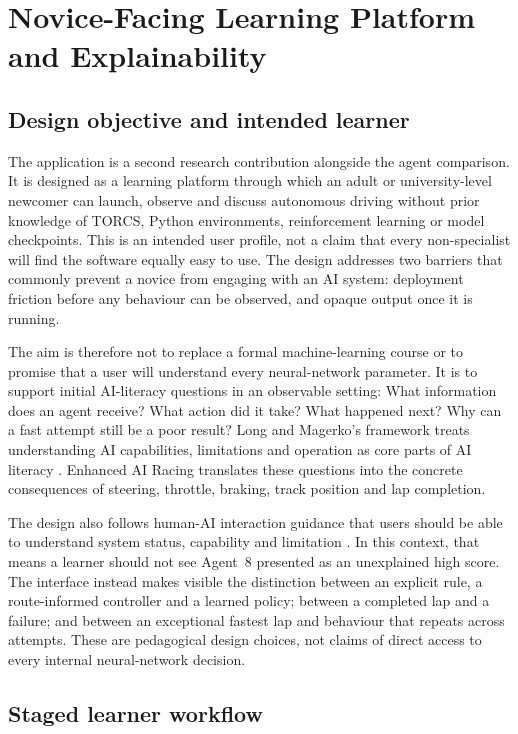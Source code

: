 \section{Novice-Facing Learning Platform and Explainability}
\label{ch:telemetry-gui}

\subsection{Design objective and intended learner}

The application is a second research contribution alongside the agent comparison. It is designed as a learning platform through which an adult or university-level newcomer can launch, observe and discuss autonomous driving without prior knowledge of TORCS, Python environments, reinforcement learning or model checkpoints. This is an intended user profile, not a claim that every non-specialist will find the software equally easy to use. The design addresses two barriers that commonly prevent a novice from engaging with an AI system: deployment friction before any behaviour can be observed, and opaque output once it is running.

The aim is therefore not to replace a formal machine-learning course or to promise that a user will understand every neural-network parameter. It is to support initial AI-literacy questions in an observable setting: What information does an agent receive? What action did it take? What happened next? Why can a fast attempt still be a poor result? Long and Magerko's framework treats understanding AI capabilities, limitations and operation as core parts of AI literacy \parencite{long2020}. Enhanced AI Racing translates these questions into the concrete consequences of steering, throttle, braking, track position and lap completion.

The design also follows human-AI interaction guidance that users should be able to understand system status, capability and limitation \parencite{amershi2019}. In this context, that means a learner should not see Agent~8 presented as an unexplained high score. The interface instead makes visible the distinction between an explicit rule, a route-informed controller and a learned policy; between a completed lap and a failure; and between an exceptional fastest lap and behaviour that repeats across attempts. These are pedagogical design choices, not claims of direct access to every internal neural-network decision.

\subsection{Staged learner workflow}


